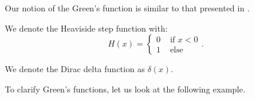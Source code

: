 \documentclass[a4paper,12pt]{article}
\begin{document}
\begin{related}
  Our notion of the Green's function is similar to that presented
  in \cite{hwang_simulationtabulation_2001}.
\end{related}


\begin{notation}[$H$]
  We denote the Heaviside step function with:
  \begin{equation}
    H(x) = \begin{cases}
      0 & \text{ if } x<0 \\
      1 & \text{ else }
    \end{cases}.
  \end{equation}
\end{notation}

\begin{notation}[$\delta$]
  We denote the Dirac delta function as $\delta(x)$.
\end{notation}


To clarify Green's functions, let us look at the following example.
\end{document}
